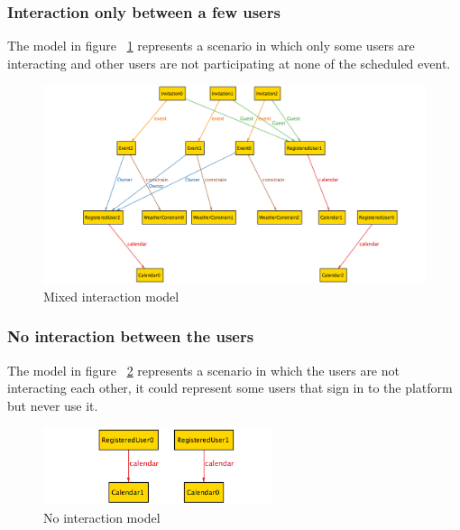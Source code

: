 \subsubsection{Interaction only between a few users}
The model in figure ~\ref{fig:mixint} represents a scenario in which only some users are interacting and other users are not participating at none of the scheduled event.
\begin{center}
 \begin{figure}[H]
    \includegraphics[width=1.1\textwidth,height=0.7\textwidth]{../Alloy/mixInt.png}
    \caption{Mixed interaction model}
     \label{fig:mixint}
     \end{figure}
   \end{center} 
\subsubsection{No interaction between the users}
The model in figure ~\ref{fig:noint} represents a scenario in which the users are not interacting each other, it could represent some users that sign in to the platform but never use it.
\begin{center}
 \begin{figure}[H]
    \includegraphics[width=0.6\textwidth]{../Alloy/noInteration.png}
    \caption{No interaction model}
     \label{fig:noint}
     \end{figure}
   \end{center} 